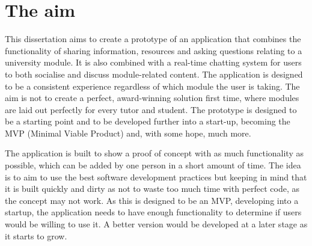 \section{The aim}

This dissertation aims to create a prototype of an application that combines the functionality of sharing information, resources and asking questions relating to a university module. It is also combined with a real-time chatting system for users to both socialise and discuss module-related content. The application is designed to be a consistent experience regardless of which module the user is taking. The aim is not to create a perfect, award-winning solution first time, where modules are laid out perfectly for every tutor and student. The prototype is designed to be a starting point and to be developed further into a start-up, becoming the MVP (Minimal Viable Product) and, with some hope, much more.

The application is built to show a proof of concept with as much functionality as possible, which can be added by one person in a short amount of time. The idea is to aim to use the best software development practices but keeping in mind that it is built quickly and dirty as not to waste too much time with perfect code, as the  concept may not work. As this is designed to be an MVP, developing into a startup, the application needs to have enough functionality to determine if users would be willing to use it. A better version would be developed at a later stage as it starts to grow.